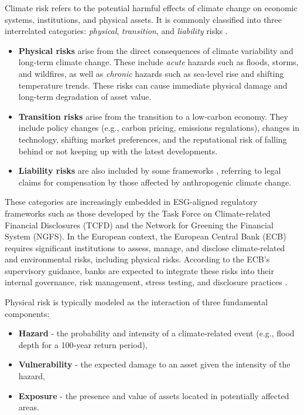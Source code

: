 Climate risk refers to the potential harmful effects of climate change on economic systems, institutions, and physical assets. It is commonly classified into three interrelated categories: \textit{physical}, \textit{transition}, and \textit{liability} risks \cite{moorhouse2024}.

\begin{itemize}
    \item \textbf{Physical risks} arise from the direct consequences of climate variability and long-term climate change. These include \textit{acute} hazards such as floods, storms, and wildfires, as well as \textit{chronic} hazards such as sea-level rise and shifting temperature trends. These risks can cause immediate physical damage and long-term degradation of asset value.
    
    \item \textbf{Transition risks} arise from the transition to a low-carbon economy. They include policy changes (e.g., carbon pricing, emissions regulations), changes in technology, shifting market preferences, and the reputational risk of falling behind or not keeping up with the latest developments.
    
    \item \textbf{Liability risks} are also included by some frameworks \cite{woetzel2020climate}, referring to legal claims for compensation by those affected by anthropogenic climate change.
\end{itemize}

These categories are increasingly embedded in ESG-aligned regulatory frameworks such as those developed by the Task Force on Climate-related Financial Disclosures (TCFD) and the Network for Greening the Financial System (NGFS). In the European context, the European Central Bank (ECB) requires significant institutions to assess, manage, and disclose climate-related and environmental risks, including physical risks. According to the ECB’s supervisory guidance, banks are expected to integrate these risks into their internal governance, risk management, stress testing, and disclosure practices \cite{ecb2020}.

Physical risk is typically modeled as the interaction of three fundamental components:

\begin{itemize}
    \item \textbf{Hazard} - the probability and intensity of a climate-related event (e.g., flood depth for a 100-year return period),
    \item \textbf{Vulnerability} - the expected damage to an asset given the intensity of the hazard,
    \item \textbf{Exposure} - the presence and value of assets located in potentially affected areas.
\end{itemize}

